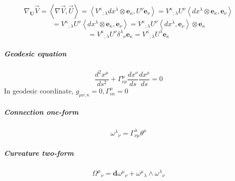 \documentclass[a4paper,12pt]{report}
\newcommand{\mean}[1]{\left\langle #1 \right\rangle }
\begin{document}
$$\nabla_\mathbf{U}\vec{V}=\mean{\nabla\vec{V},\vec{U}}=\mean{{V^\kappa}_{;\lambda}dx^{\lambda}\otimes\mathbf{e}_\kappa, U^\nu\mathbf{e}_\nu}={V^\kappa}_{;\lambda} U^\nu\mean{dx^{\lambda}\otimes\mathbf{e}_\kappa,\mathbf{e}_\nu}$$
$$={V^\kappa}_{;\lambda} U^\nu\mean{dx^{\lambda}\otimes\mathbf{e}_\kappa,\mathbf{e}_\nu}={V^\kappa}_{;\lambda} U^\nu\mean{dx^{\lambda},\mathbf{e}_\nu}\otimes\mathbf{e}_\kappa$$
$$={V^\kappa}_{;\lambda} U^\nu{\delta^\lambda}_{\nu}\mathbf{e}_\kappa={V^\kappa}_{;\lambda}U^\lambda\mathbf{e}_\kappa$$
\subparagraph{Geodesic equation}
$$\frac{d^2x^\mu}{ds^2}+\Gamma^\mu_{\nu\rho}\frac{dx^\nu}{ds}\frac{dx^\rho}{ds}=0$$
In geodesic coordinate, $g_{\mu\nu,\kappa}=0, \Gamma^{\mu}_{\nu\kappa}=0$
\subparagraph{Connection one-form}
$${\omega^\lambda}_{\nu}=\Gamma^{\lambda}_{\nu\mu}\theta^{\mu}$$
\subparagraph{Curvature two-form}
$${\Omega^\mu}_{\nu}=\mathbf{d}{\omega^\mu}_{\nu}+{\omega^\mu}_\lambda\wedge{\omega^\lambda}_\nu$$
\end{document}
